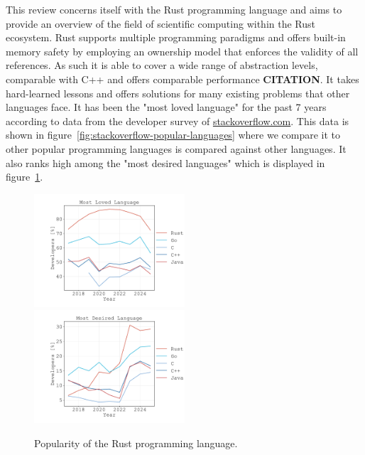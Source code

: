 \documentclass{article}
\begin{document}
This review concerns itself with the Rust programming language and aims to provide an overview
of the field of scientific computing within the Rust ecosystem.
Rust supports multiple programming paradigms and offers built-in memory safety by employing an
ownership model that enforces the validity of all references.
As such it is able to cover a wide range of abstraction levels, comparable with C++ and offers
comparable performance \textbf{CITATION}.
It takes hard-learned lessons and offers solutions for many existing problems that other languages
face.
It has been the "most loved language" for the past 7 years according to data from the developer
survey of \url{stackoverflow.com}.
This data is shown in figure~\ref{fig:stackoverflow-popular-languages} where we compare it to other
popular programming languages is compared against other languages.
It also ranks high among the "most desired languages" which is displayed in
figure~\ref{fig:stackoverflow-desired-languages}.

\begin{figure}
    \centering
    \includegraphics[width=0.5\textwidth]{figures/stackoverflow-loved-language.pdf}%
    \includegraphics[width=0.5\textwidth]{figures/stackoverflow-desired-language.pdf}
    \caption{
        Popularity of the Rust programming language.
    }
    \label{fig:stackoverflow-desired-languages}
\end{figure}
\end{document}
